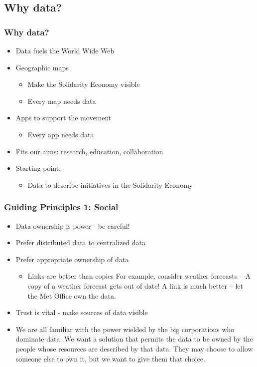 \subsection{Why data?}
\startslide
\frame
{
  \frametitle{Why data?}
  \begin{itemize}
    \item<1-> Data fuels the World Wide Web
    \item<2-> Geographic maps
      \begin{itemize}
	\item Make the Solidarity Economy visible
	\item Every map needs data
      \end{itemize}
    \item<3-> Apps to support the movement
      \begin{itemize}
	\item Every app needs data
      \end{itemize}
    \item<4-> Fits our aims: research, education, collaboration
    \item<4-> Starting point:
      \begin{itemize}
	\item Data to describe initiatives in the Solidarity Economy
      \end{itemize}
  \end{itemize}
}
\slideend
\startslide
\frame
{
  \frametitle{Guiding Principles 1: Social}
  \begin{itemize}
    \item<1-> Data ownership is power - be careful!
    \item<2-> Prefer distributed data to centralized data
    \item<2-> Prefer appropriate ownership of data
      \begin{itemize}
	\item Links are better than copies
	  \only<article> {For example, consider weather forecasts --
	  A copy of a weather forecast gets out of date!
	  A link is much better -- let the Met Office own the data.}
      \end{itemize}
    \item<3-> Trust is vital - make sources of data visible
    \item<article> We are all familiar with the power wielded by the big corporations who dominate data.
      We want a solution that permits the data to be owned by the people whose resources are described by that data.
      They may choose to allow someone else to own it, but we want to give them that choice.
  \end{itemize}
}
\slideend
